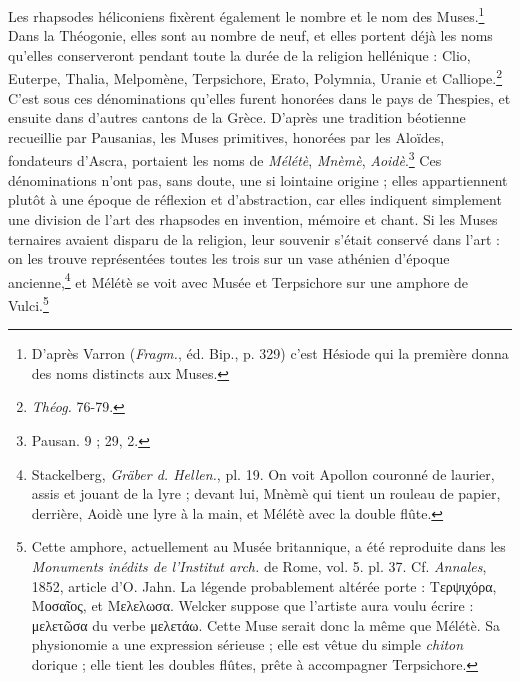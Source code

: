 \documentclass[a4paper, 11pt, oneside, polutonikogreek, french]{article}
\begin{document}
Les rhapsodes héliconiens fixèrent également le nombre et le nom des Muses.\footnote{D'après Varron (\emph{Fragm.}, éd. Bip., p. 329) c'est Hésiode qui la première donna des noms distincts aux Muses.} Dans la Théogonie, elles sont au nombre de neuf, et elles portent déjà les noms qu'elles conserveront pendant toute la durée de la religion hellénique : Clio, Euterpe, Thalia, Melpomène, Terpsichore, Erato, Polymnia, Uranie et Calliope.\footnote{\emph{Théog.} 76-79.} C'est sous ces dénominations qu'elles furent honorées dans le pays de Thespies, et ensuite dans d'autres cantons de la Grèce. D'après une tradition béotienne recueillie par Pausanias, les Muses primitives, honorées par les Aloïdes, fondateurs d'Ascra, portaient les noms de \emph{Mélétè}, \emph{Mnèmè}, \emph{Aoidè}.\footnote{Pausan. 9 ; 29, 2.} Ces dénominations n'ont pas, sans doute, une si lointaine origine ; elles appartiennent plutôt à une époque de réflexion et d'abstraction, car elles indiquent simplement une division de l'art des rhapsodes en invention, mémoire et chant. Si les Muses ternaires avaient disparu de la religion, leur souvenir s'était conservé dans l'art : on les trouve représentées toutes les trois sur un vase athénien d'époque ancienne,\footnote{Stackelberg, \emph{Gräber d. Hellen.}, pl. 19. On voit Apollon couronné de laurier, assis et jouant de la lyre ; devant lui, Mnèmè qui tient un rouleau de papier, derrière, Aoidè une lyre à la main, et Mélétè avec la double flûte.} et Mélétè se voit avec Musée et Terpsichore sur une amphore de Vulci.\footnote{Cette amphore, actuellement au Musée britannique, a été reproduite dans les \emph{Monuments inédits de l'Institut arch.} de Rome, vol. 5. pl. 37. Cf. \emph{Annales}, 1852, article d'O. Jahn. La légende probablement altérée porte : Τερψιχόρα, Μοσαῖος, et Μελελωσα. Welcker suppose que l'artiste aura voulu écrire : μελετῶσα du verbe μελετάω. Cette Muse serait donc la même que Mélétè. Sa physionomie a une expression sérieuse ; elle est vêtue du simple \emph{chiton} dorique ; elle tient les doubles flûtes, prête à accompagner Terpsichore.}
\end{document}
